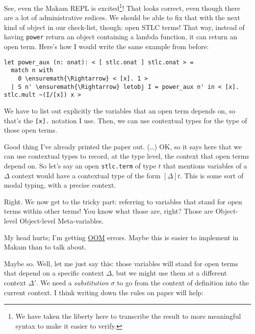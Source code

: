 \heroADVISOR{} See, even the Makam REPL is
excited\footnote{We have taken the liberty here to transcribe the result to more meaningful syntax to make it easier to verify.}!
That looks correct, even though there are a lot of administrative
redices. We should be able to fix that with the next kind of object in
our check-list, though: open STLC terms! That way, instead of having
\texttt{power} return an object containing a lambda function, it can
return an open term. Here's how I would write the same example from
before:

\begin{verbatim}
let power_aux (n: onat): < [ stlc.onat ] stlc.onat > =
  match n with
    0 \ensuremath{\Rightarrow} < [x]. 1 >
  | S n' \ensuremath{\Rightarrow} letobj I = power_aux n' in < [x]. stlc.mult ~(I/[x]) x >
\end{verbatim}

\noindent
We have to list out explicitly the variables that an open term depends
on, so that's the \texttt{{[}x{]}.} notation I use. Then, we can use
contextual types \citep{nanevski2008contextual} for the type of those
open terms.

\heroSTUDENT{} Good thing I've already printed the paper out. (\ldots{}) OK,
so it says here that we can use contextual types to record, at the type
level, the context that open terms depend on. So let's say an open
\texttt{stlc.term} of type \(t\) that mentions variables of a \(\Delta\)
context would have a contextual type of the form \([\Delta] t\). This is
some sort of modal typing, with a precise context.

\heroADVISOR{} Right. We now get to the tricky part: referring to variables
that stand for open terms within other terms! You know what those are,
right? Those are Object-level Object-level Meta-variables.

\heroSTUDENT{} My head hurts; I'm getting
\href{https://en.wikipedia.org/wiki/Out_of_memory}{OOM} errors. Maybe
this is easier to implement in Makam than to talk about.

\heroADVISOR{} Maybe so. Well, let me just say this: those variables will
stand for open terms that depend on a specific context \(\Delta\), but
we might use them at a different context \(\Delta'\). We need a
\emph{substitution} \(\sigma\) to go from the context of definition into
the current context. I think writing down the rules on paper will help:

